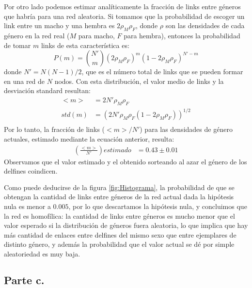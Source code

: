 \par Por otro lado podemos estimar analíticamente la fracción de links entre géneros que habría para una red aleatoria. Si tomamos que la probabilidad de escoger un link entre un macho y una hembra es $2 \rho_{M} \rho_{F}$, donde $\rho$ son las densidades de cada género en la red real ($M$ para macho, $F$ para hembra), entonces la probabilidad de tomar $m$ links de esta característica es:
\begin{equation}
	P(m) = {N' \choose m} (2 \rho_{M} \rho_{F})^{m} (1 - 2 \rho_{M} \rho_{F})^{N' - m}
\end{equation}
donde $N' = N(N-1)/2$, que es el número total de links que se pueden formar en una red de $N$ nodos. Con esta distribución, el valor medio de links y la desviación standard resultan:
\begin{align*}
	<m> & = 2 N' \rho_{M} \rho_{F} \\
	std(m) & = (2 N' \rho_{M} \rho_{F} (1 - 2 \rho_{M} \rho_{F}))^{1/2}\\
\end{align*}
Por lo tanto, la fracción de links ($<m>/N'$) para las densidades de género actuales, estimado mediante la ecuación anterior, resulta:
\begin{align*}
	(\frac{<m>}{N'}){estimado} & = 0.43 \pm 0.01
\end{align*}
Observamos que el valor estimado y el obtenido sorteando al azar el género de los delfines coindicen.
\par Como puede deducirse de la figura \ref{fig:Histograma}, la probabilidad de que se obtengan la cantidad de links entre géneros de la red actual dada la hipótesis nula es menor a $0.005$, por lo que descartamos la hipótesis nula, y concluimos que la red es homofílica: la cantidad de links entre géneros es mucho menor que el valor esperado si la distribución de géneros fuera aleatoria, lo que implica que hay más cantidad de enlaces entre delfines del mismo sexo que entre ejemplares de distinto género, y además la probabilidad que el valor actual se dé por simple aleatoriedad es muy baja.

\subsection{Parte c.}

